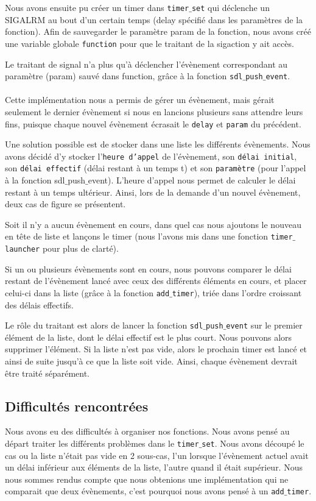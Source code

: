 \documentclass[a4paper, 12pt]{article}
\begin{document}
	Nous avons ensuite pu créer un timer dans \texttt{timer$\_$set} qui déclenche un SIGALRM au bout d'un certain temps (delay spécifié dans les paramètres de la fonction).
	Afin de sauvegarder le paramètre param de la fonction, nous avons créé une variable globale \texttt{function} pour que le traitant de la sigaction y ait accès.
	
	Le traitant de signal n'a plus qu'à déclencher l'évènement correspondant au paramètre (param) sauvé dans function, grâce à la fonction \texttt{sdl$\_$push$\_$event}. \\
	\\
	Cette implémentation nous a permis de gérer un évènement, mais gérait seulement le dernier évènement si nous en lancions plusieurs sans attendre leurs fins, puisque chaque nouvel évènement écrasait le \texttt{delay} et \texttt{param} du précédent.
	
	Une solution possible est de stocker dans une liste les différents évènements. Nous avons décidé d'y stocker l'\texttt{heure d'appel} de l'évènement, son \texttt{délai initial}, son \texttt{délai effectif} (délai restant à un temps t) et son \texttt{paramètre} (pour l'appel à la fonction sdl$\_$push$\_$event). L'heure d'appel nous permet de calculer le délai restant à un temps ultérieur. Ainsi, lors de la demande d'un nouvel évènement, deux cas de figure se présentent.
	
	Soit il n'y a aucun évènement en cours, dans quel cas nous ajoutons le nouveau en tête de liste et lançons le timer (nous l'avons mis dans une fonction \texttt{timer$\_$launcher} pour plus de clarté).
		
	Si un ou plusieurs évènements sont en cours, nous pouvons comparer le délai restant de l'évènement lancé avec ceux des différents éléments en cours, et placer celui-ci dans la liste (grâce à la fonction \texttt{add$\_$timer}), triée dans l'ordre croissant des délais effectifs.
	
	Le rôle du traitant est alors de lancer la fonction \texttt{sdl$\_$push$\_$event} sur le premier élément de la liste, dont le délai effectif est le plus court. Nous pouvons alors supprimer l'élément. Si la liste n'est pas vide, alors le prochain timer est lancé et ainsi de suite jusqu'à ce que la liste soit vide.
	Ainsi, chaque évènement devrait être traité séparément.
	
	\subsection{Difficultés rencontrées}
	Nous avons eu des difficultés à organiser nos fonctions.
	Nous avons pensé au départ traiter les différents problèmes dans le \texttt{timer$\_$set}. Nous avons découpé le cas ou la liste n'était pas vide en 2 sous-cas, l'un lorsque l'évènement actuel avait un délai inférieur aux éléments de la liste, l'autre quand il était supérieur. Nous nous sommes rendus compte que nous obtenions une implémentation qui ne comparait que deux évènements, c'est pourquoi nous avons pensé à un \texttt{add$\_$timer}.
	
\end{document}
